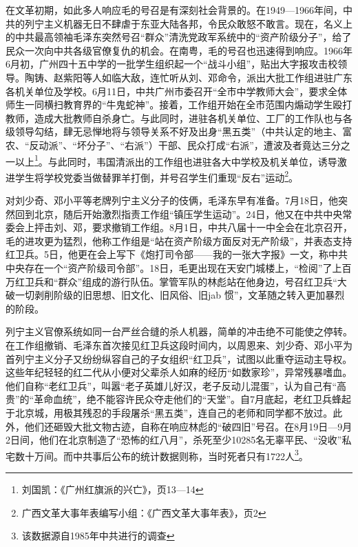 在文革初期，如此多人响应毛的号召是有深刻社会背景的。在1949—1966年间，中共的列宁主义机器无日不肆虐于东亚大陆各邦，令民众敢怒不敢言。现在，名义上的中共最高领袖毛泽东突然号召“群众”清洗党政军系统中的“资产阶级分子”，给了民众一次向中共各级官僚复仇的机会。在南粤，毛的号召也迅速得到响应。1966年6月初，广州四十五中学的一批学生组织起一个“战斗小组”，贴出大字报攻击校领导。陶铸、赵紫阳等人如临大敌，连忙听从刘、邓命令，派出大批工作组进驻广东各机关单位及学校。6月11日，中共广州市委召开“全市中学教师大会”，要求全体师生一同横扫教育界的“牛鬼蛇神”。接着，工作组开始在全市范围内煽动学生殴打教师，造成大批教师自杀身亡。与此同时，进驻各机关单位、工厂的工作队也与各级领导勾结，肆无忌惮地将与领导关系不好及出身“黑五类”（中共认定的地主、富农、“反动派”、“坏分子”、“右派”）干部、民众打成“右派”，遭波及者竟达三分之一以上\footnote{刘国凯：《广州红旗派的兴亡》，页13—14}。与此同时，韦国清派出的工作组也进驻各大中学校及机关单位，诱导激进学生将学校党委当做替罪羊打倒，并号召学生们重现“反右”运动\footnote{广西文革大事年表编写小组：《广西文革大事年表》，页2}。

对刘少奇、邓小平等老牌列宁主义分子的伎俩，毛泽东早有准备。7月18日，他突然回到北京，随后开始激烈指责工作组“镇压学生运动”。24日，他又在中共中央常委会上抨击刘、邓，要求撤销工作组。8月1日，中共八届十一中全会在北京召开，毛的进攻更为猛烈，他称工作组是“站在资产阶级方面反对无产阶级”，并表态支持红卫兵。5日，他更在会上写下《炮打司令部——我的一张大字报》一文，称中共中央存在一个“资产阶级司令部”。18日，毛更出现在天安门城楼上，“检阅”了上百万红卫兵和“群众”组成的游行队伍。掌管军队的林彪站在他身边，号召红卫兵“大破一切剥削阶级的旧思想、旧文化、旧风俗、旧jab 惯”，文革随之转入更加暴烈的阶段。

列宁主义官僚系统如同一台严丝合缝的杀人机器，简单的冲击绝不可能使之停转。在工作组撤销、毛泽东首次接见红卫兵这段时间内，以周恩来、刘少奇、邓小平为首列宁主义分子又纷纷纵容自己的子女组织“红卫兵”，试图以此重夺运动主导权。这些年纪轻轻的红二代从小便对父辈杀人如麻的经历“如数家珍”，异常残暴嗜血。他们自称“老红卫兵”，叫嚣“老子英雄儿好汉，老子反动儿混蛋”，认为自己有“高贵”的“革命血统”，绝不能容许民众夺走他们的“天堂”。自7月底起，老红卫兵蜂起于北京城，用极其残忍的手段屠杀“黑五类”，连自己的老师和同学都不放过。此外，他们还砸毁大批文物古迹，自称在响应林彪的“破四旧”号召。在8月19日—9月2日间，他们在北京制造了“恐怖的红八月”，杀死至少10285名无辜平民、“没收”私宅数十万间。而中共事后公布的统计数据则称，当时死者只有1722人\footnote{该数据源自1985年中共进行的调查}。

